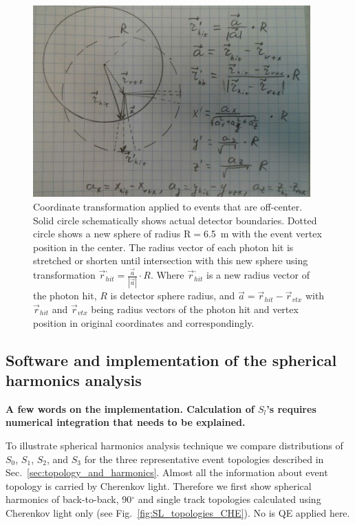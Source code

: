 \begin{figure}[h]
  \centering
  \includegraphics[width=0.95\textwidth]{plots/SphH_transform_sketch.JPG}
  \caption{Coordinate transformation applied to events that are
    off-center. Solid circle schematically shows actual detector
    boundaries. Dotted circle shows a new sphere of radius R$=$6.5~m
    with the event vertex position in the center. The radius vector of
    each photon hit is stretched or shorten until intersection with
    this new sphere using transformation $\vec{r}^{,}_{hit} =
    \frac{\vec{a}}{|\vec{a}|} \cdot R$. Where $\vec{r}^{,}_{hit}$ is a
    new radius vector of the photon hit, $R$ is detector sphere radius,
    and $\vec{a}=\vec{r}_{hit} - \vec{r}_{vtx}$ with $\vec{r}_{hit}$
    and $\vec{r}_{vtx}$ being radius vectors of the photon hit and
    vertex position in original coordinates and correspondingly.}
  \label{fig:SphH_transform}
\end{figure}


\subsection{Software and implementation of the spherical harmonics analysis}
{\bf A few words on the implementation. Calculation of $S_l$'s
  requires numerical integration that needs to be explained.}

To illustrate spherical harmonics analysis technique we compare
distributions of $S_0$, $S_1$, $S_2$, and $S_3$ for the three
representative event topologies described in
Sec.~\ref{sec:topology_and_harmonics}. Almost all the information
about event topology is carried by Cherenkov light. Therefore we first
show spherical harmonics of back-to-back, 90$^{\circ}$ and single
track topologies calculated using Cherenkov light only (see
Fig.~\ref{fig:SL_topologies_CHE}). No is QE applied here.


